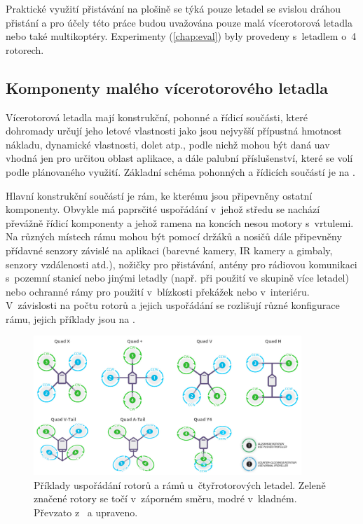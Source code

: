 Praktické využití přistávání na plošině se týká pouze letadel se svislou dráhou přistání a pro účely této práce budou uvažována pouze malá vícerotorová letadla nebo také multikoptéry. Experimenty (\cref{chap:eval}) byly provedeny s~letadlem o~4 rotorech.

\subsection{Komponenty malého vícerotorového letadla}
Vícerotorová letadla mají konstrukční, pohonné a řídicí součásti, které dohromady určují jeho letové vlastnosti jako jsou nejvyšší přípustná hmotnost nákladu, dynamické vlastnosti, dolet atp., podle nichž mohou být daná \acrshort{uav} vhodná jen pro určitou oblast aplikace, a dále palubní příslušenství, které se volí podle plánovaného využití. Základní schéma pohonných a řídicích součástí je na .

Hlavní konstrukční součástí je rám, ke kterému jsou připevněny ostatní komponenty. Obvykle má paprsčité uspořádání v~jehož středu se nachází převážně řídicí komponenty a jehož ramena na koncích nesou motory s~vrtulemi. Na různých místech rámu mohou být pomocí držáků a nosičů dále připevněny přídavné senzory závislé na aplikaci (barevné kamery, IR kamery a gimbaly, senzory vzdálenosti atd.), nožičky pro přistávání, antény pro rádiovou komunikaci s~pozemní stanicí nebo jinými letadly (např. při použití ve skupině více letadel) nebo ochranné rámy pro použití v~blízkosti překážek nebo v~interiéru. V~závislosti na počtu rotorů a jejich uspořádání se rozlišují různé konfigurace rámu, jejich příklady jsou na .
\begin{figure}
    \centering
    \includegraphics[width=0.9\textwidth]{img/intro/konfigurace.jpg}
    \caption[Uspořádání rotorů rámů u~čtyřrotorových letadel]{Příklady uspořádání rotorů a rámů u~čtyřrotorových letadel. Zeleně značené rotory se točí v~záporném směru, modré v~kladném. Převzato z~\cite{ardupilot} a upraveno.}
    \label{fig:konfigurace}
\end{figure}


